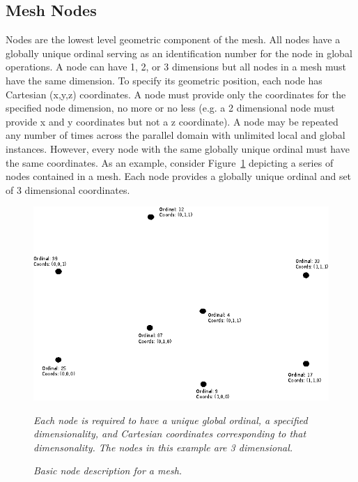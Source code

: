 \documentclass[letterpaper,12pt]{article}
\begin{document}
\subsection{Mesh Nodes}\label{subsec:nodes}
Nodes are the lowest level geometric component of the mesh. All nodes
have a globally unique ordinal serving as an identification number for
the node in global operations. A node can have 1, 2, or 3 dimensions
but all nodes in a mesh must have the same dimension. To specify its
geometric position, each node has Cartesian (x,y,z) coordinates. A
node must provide only the coordinates for the specified node
dimension, no more or no less (e.g. a 2 dimensional node must provide
x and y coordinates but not a z coordinate). A node may be repeated
any number of times across the parallel domain with unlimited local
and global instances. However, every node with the same globally
unique ordinal must have the same coordinates. As an example, consider
Figure~\ref{fig:mesh_nodes} depicting a series of nodes contained in
a mesh. Each node provides a globally unique ordinal and set of 3
dimensional coordinates.

\begin{figure}[htpb!]
  \centering
  \includegraphics[width=5in]{hex_nodes.eps}
  \caption{\sl Basic node description for a mesh.}{\sl Each node is
    required to have a unique global ordinal, a specified
    dimensionality, and Cartesian coordinates corresponding to that
    dimensonality. The nodes in this example are 3 dimensional.}
  \label{fig:mesh_nodes}
\end{figure}
\end{document}
